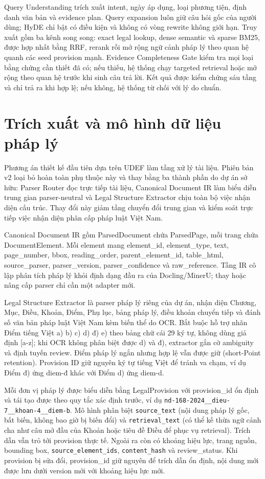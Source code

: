 \documentclass[12pt,a4paper]{article}
\begin{document}
Query Understanding trích xuất intent, ngày áp dụng, loại phương tiện, định danh văn bản và evidence plan. Query expansion luôn giữ câu hỏi gốc của người dùng; HyDE chỉ bật có điều kiện và không có vòng rewrite không giới hạn. Truy xuất gồm ba kênh song song: exact legal lookup, dense semantic và sparse BM25, được hợp nhất bằng RRF, rerank rồi mở rộng ngữ cảnh pháp lý theo quan hệ quanh các seed provision mạnh. Evidence Completeness Gate kiểm tra mọi loại bằng chứng cần thiết đã có; nếu thiếu, hệ thống chạy targeted retrieval hoặc mở rộng theo quan hệ trước khi sinh câu trả lời. Kết quả được kiểm chứng sáu tầng và chỉ trả ra khi hợp lệ; nếu không, hệ thống từ chối với lý do chuẩn.

\section{Trích xuất và mô hình dữ liệu pháp lý}

Phương án thiết kế đầu tiên dựa trên UDEF làm tầng xử lý tài liệu. Phiên bản v2 loại bỏ hoàn toàn phụ thuộc này và thay bằng ba thành phần do dự án sở hữu: Parser Router đọc trực tiếp tài liệu, Canonical Document IR làm biểu diễn trung gian parser-neutral và Legal Structure Extractor chịu toàn bộ việc nhận diện cấu trúc. Thay đổi này giảm tầng chuyển đổi trung gian và kiểm soát trực tiếp việc nhận diện phân cấp pháp luật Việt Nam.

Canonical Document IR gồm ParsedDocument chứa ParsedPage, mỗi trang chứa DocumentElement. Mỗi element mang element\_id, element\_type, text, page\_number, bbox, reading\_order, parent\_element\_id, table\_html, source\_parser, parser\_version, parser\_confidence và raw\_reference. Tầng IR cô lập phân tích pháp lý khỏi định dạng đầu ra của Docling/MinerU; thay hoặc nâng cấp parser chỉ cần một adapter mới.

Legal Structure Extractor là parser pháp lý riêng của dự án, nhận diện Chương, Mục, Điều, Khoản, Điểm, Phụ lục, bảng pháp lý, điều khoản chuyển tiếp và đánh số văn bản pháp luật Việt Nam kèm biến thể do OCR. Bắt buộc hỗ trợ nhãn Điểm tiếng Việt a) b) c) d) đ) e) theo bảng chữ cái 29 ký tự, không dùng giả định [a-z]; khi OCR không phân biệt được d) và đ), extractor gắn cờ ambiguity và định tuyến review. Điểm pháp lý ngắn nhưng hợp lệ vẫn được giữ (short-Point retention). Provision ID giữ nguyên ký tự tiếng Việt để tránh va chạm, ví dụ Điểm đ) ứng diem-đ khác với Điểm d) ứng diem-d.

Mỗi đơn vị pháp lý được biểu diễn bằng LegalProvision với provision\_id ổn định và tái tạo được theo quy tắc xác định trước, ví dụ \texttt{nd-168-2024\_\_dieu-7\_\_khoan-4\_\_diem-b}. Mô hình phân biệt \texttt{source\_text} (nội dung pháp lý gốc, bất biến, không bao giờ bị biến đổi) và \texttt{retrieval\_text} (có thể kế thừa ngữ cảnh cha như câu mở đầu của Khoản hoặc tiêu đề Điều để phục vụ retrieval). Trích dẫn vẫn trỏ tới provision thực tế. Ngoài ra còn có khoảng hiệu lực, trang nguồn, bounding box, \texttt{source\_element\_ids}, \texttt{content\_hash} và review\_status. Khi provision bị sửa đổi, provision\_id giữ nguyên để trích dẫn ổn định, nội dung mới được lưu dưới version mới với khoảng hiệu lực mới.
\end{document}
